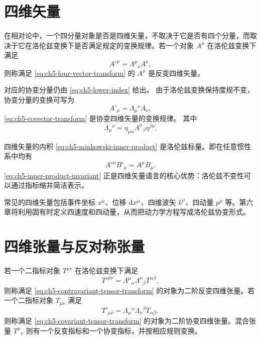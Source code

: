 \section{四维矢量}

在相对论中，一个四分量对象是否是四维矢量，不取决于它是否有四个分量，而取决于它在洛伦兹变换下是否满足规定的变换规律。若一个对象 $A^{\mu}$ 在洛伦兹变换下满足
\begin{equation}
\label{eq:ch5-four-vector-transform}
A'^{\mu}=\Lambda^{\mu}{}_{\nu} A^{\nu},
\end{equation}
则称满足 \eqref{eq:ch5-four-vector-transform} 的 $A^{\mu}$ 是反变四维矢量。

对应的协变分量仍由 \eqref{eq:ch5-lower-index} 给出。
由于洛伦兹变换保持度规不变，协变分量的变换可写为
\begin{equation}
\label{eq:ch5-covector-transform}
A'_{\mu}=\Lambda_{\mu}{}^{\nu} A_{\nu},
\end{equation}
\eqref{eq:ch5-covector-transform} 是协变四维矢量的变换规律。
其中
\[
\Lambda_{\mu}{}^{\nu}=\eta_{\mu\alpha}\Lambda^{\alpha}{}_{\beta}\eta^{\beta\nu}.
\]

四维矢量的内积 \eqref{eq:ch5-minkowski-inner-product} 是洛伦兹标量。即在任意惯性系中均有
\begin{equation}
\label{eq:ch5-inner-product-invariant}
A'^{\mu} B'_{\mu}=A^{\mu} B_{\mu}.
\end{equation}
\eqref{eq:ch5-inner-product-invariant} 正是四维矢量语言的核心优势：洛伦兹不变性可以通过指标缩并简洁表示。

常见的四维矢量包括事件坐标 $x^{\mu}$、位移 $\mathop{}\!\mathrm{d} x^{\mu}$、四维波矢 $k^{\mu}$、四动量 $p^{\mu}$ 等。第六章将利用固有时定义四速度和四动量，从而把动力学方程写成洛伦兹协变形式。

\section{四维张量与反对称张量}

若一个二指标对象 $T^{\mu\nu}$ 在洛伦兹变换下满足
\begin{equation}
\label{eq:ch5-contravariant-tensor-transform}
T'^{\mu\nu}
=
\Lambda^{\mu}{}_{\alpha}\Lambda^{\nu}{}_{\beta}T^{\alpha\beta},
\end{equation}
则称满足 \eqref{eq:ch5-contravariant-tensor-transform} 的对象为二阶反变四维张量。若一个二指标对象 $T_{\mu\nu}$ 满足
\begin{equation}
\label{eq:ch5-covariant-tensor-transform}
T'_{\mu\nu}
=
\Lambda_{\mu}{}^{\alpha}\Lambda_{\nu}{}^{\beta}T_{\alpha\beta},
\end{equation}
则称满足 \eqref{eq:ch5-covariant-tensor-transform} 的对象为二阶协变四维张量。混合张量 $T^{\mu}{}_{\nu}$ 则有一个反变指标和一个协变指标，并按相应规则变换。

